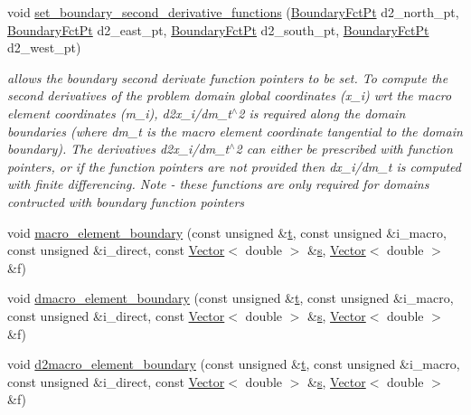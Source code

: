 \begin{DoxyCompactItemize}
void \hyperlink{classoomph_1_1TopologicallyRectangularDomain_a69d21da2d4dff225943aab99fb4f1f10}{set\+\_\+boundary\+\_\+second\+\_\+derivative\+\_\+functions} (\hyperlink{classoomph_1_1TopologicallyRectangularDomain_a8b2e24f5500d86c93aef509c5410e7cc}{Boundary\+Fct\+Pt} d2\+\_\+north\+\_\+pt, \hyperlink{classoomph_1_1TopologicallyRectangularDomain_a8b2e24f5500d86c93aef509c5410e7cc}{Boundary\+Fct\+Pt} d2\+\_\+east\+\_\+pt, \hyperlink{classoomph_1_1TopologicallyRectangularDomain_a8b2e24f5500d86c93aef509c5410e7cc}{Boundary\+Fct\+Pt} d2\+\_\+south\+\_\+pt, \hyperlink{classoomph_1_1TopologicallyRectangularDomain_a8b2e24f5500d86c93aef509c5410e7cc}{Boundary\+Fct\+Pt} d2\+\_\+west\+\_\+pt)
\begin{DoxyCompactList}\small\item\em allows the boundary second derivate function pointers to be set. To compute the second derivatives of the problem domain global coordinates (x\+\_\+i) wrt the macro element coordinates (m\+\_\+i), d2x\+\_\+i/dm\+\_\+t$^\wedge$2 is required along the domain boundaries (where dm\+\_\+t is the macro element coordinate tangential to the domain boundary). The derivatives d2x\+\_\+i/dm\+\_\+t$^\wedge$2 can either be prescribed with function pointers, or if the function pointers are not provided then dx\+\_\+i/dm\+\_\+t is computed with finite differencing. Note -\/ these functions are only required for domains contructed with boundary function pointers \end{DoxyCompactList}\item 
void \hyperlink{classoomph_1_1TopologicallyRectangularDomain_a4de4d505233303cee0690ee87e45b4cf}{macro\+\_\+element\+\_\+boundary} (const unsigned \&\hyperlink{cfortran_8h_af6f0bd3dc13317f895c91323c25c2b8f}{t}, const unsigned \&i\+\_\+macro, const unsigned \&i\+\_\+direct, const \hyperlink{classoomph_1_1Vector}{Vector}$<$ double $>$ \&\hyperlink{cfortran_8h_ab7123126e4885ef647dd9c6e3807a21c}{s}, \hyperlink{classoomph_1_1Vector}{Vector}$<$ double $>$ \&f)
\item 
void \hyperlink{classoomph_1_1TopologicallyRectangularDomain_a218b22a016e2f330d6b90354597d9786}{dmacro\+\_\+element\+\_\+boundary} (const unsigned \&\hyperlink{cfortran_8h_af6f0bd3dc13317f895c91323c25c2b8f}{t}, const unsigned \&i\+\_\+macro, const unsigned \&i\+\_\+direct, const \hyperlink{classoomph_1_1Vector}{Vector}$<$ double $>$ \&\hyperlink{cfortran_8h_ab7123126e4885ef647dd9c6e3807a21c}{s}, \hyperlink{classoomph_1_1Vector}{Vector}$<$ double $>$ \&f)
\item 
void \hyperlink{classoomph_1_1TopologicallyRectangularDomain_a0b882a9e660cab447c6be8cbeb8c9c18}{d2macro\+\_\+element\+\_\+boundary} (const unsigned \&\hyperlink{cfortran_8h_af6f0bd3dc13317f895c91323c25c2b8f}{t}, const unsigned \&i\+\_\+macro, const unsigned \&i\+\_\+direct, const \hyperlink{classoomph_1_1Vector}{Vector}$<$ double $>$ \&\hyperlink{cfortran_8h_ab7123126e4885ef647dd9c6e3807a21c}{s}, \hyperlink{classoomph_1_1Vector}{Vector}$<$ double $>$ \&f)
\end{DoxyCompactItemize}
